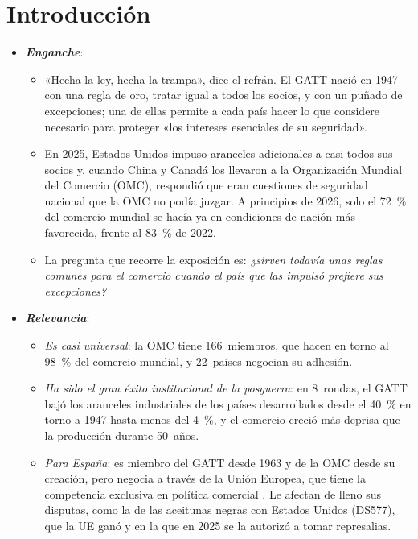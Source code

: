 \documentclass[11pt]{article}
\begin{document}
\tceetitulo

\section*{Introducción}

\begin{itemize}
\item \textbf{\emph{Enganche}}:
  \begin{itemize}
  \item «Hecha la ley, hecha la trampa», dice el refrán. El GATT nació en 1947 con una regla de oro, tratar igual a todos los socios, y con un puñado de excepciones; una de ellas permite a cada país hacer lo que considere necesario para proteger «los intereses esenciales de su seguridad».
  \item En 2025, Estados Unidos impuso aranceles adicionales a casi todos sus socios y, cuando China y Canadá los llevaron a la Organización Mundial del Comercio (OMC), respondió que eran cuestiones de seguridad nacional que la OMC no podía juzgar\nocite{TWN2025DS634}. A principios de 2026, solo el 72~\% del comercio mundial se hacía ya en condiciones de nación más favorecida, frente al 83~\% de 2022\nocite{OMC2025PerfilesArancelarios,OMC2026Perspectivas}.
  \item La pregunta que recorre la exposición es: \emph{¿sirven todavía unas reglas comunes para el comercio cuando el país que las impulsó prefiere sus excepciones?}
  \end{itemize}

\item \textbf{\emph{Relevancia}}:
  \begin{itemize}
  \item \emph{Es casi universal}: la OMC tiene 166~miembros, que hacen en torno al 98~\% del comercio mundial, y 22~países negocian su adhesión\nocite{OMC2026Miembros}.
  \item \emph{Ha sido el gran éxito institucional de la posguerra}: en 8~rondas, el GATT bajó los aranceles industriales de los países desarrollados desde el 40~\% en torno a 1947 hasta menos del 4~\%\nocite{Baldwin2012Case}, y el comercio creció más deprisa que la producción durante 50~años.
  \item \emph{Para España}: es miembro del GATT desde 1963  y de la OMC desde su creación, pero negocia a través de la Unión Europea, que tiene la competencia exclusiva en política comercial . Le afectan de lleno sus disputas, como la de las aceitunas negras con Estados Unidos (DS577), que la UE ganó y en la que en 2025 se la autorizó a tomar represalias\nocite{OMC2025DS577Arbitraje}.
  \end{itemize}


\end{itemize}
\end{document}
